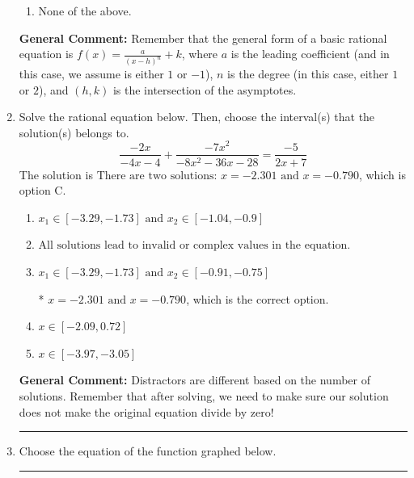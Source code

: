 \documentclass{extbook}[14pt]
\newcommand{\litem}[1]{\item #1

\rule{\textwidth}{0.4pt}}
\begin{document}
\begin{enumerate}
{\begin{enumerate}[label=\Alph*.]
\item None of the above.\end{enumerate}
\textbf{General Comment:} Remember that the general form of a basic rational equation is $ f(x) = \frac{a}{(x-h)^n} + k$, where $a$ is the leading coefficient (and in this case, we assume is either $1$ or $-1$), $n$ is the degree (in this case, either $1$ or $2$), and $(h, k)$ is the intersection of the asymptotes.
}
\litem{
Solve the rational equation below. Then, choose the interval(s) that the solution(s) belongs to.
\[ \frac{-2x}{-4x -4} + \frac{-7x^{2}}{-8x^{2} -36 x -28} = \frac{-5}{2x + 7} \]
The solution is \( \text{There are two solutions: } x = -2.301 \text{ and } x = -0.790 \), which is option C.\begin{enumerate}[label=\Alph*.]
\item \( x_1 \in [-3.29, -1.73] \text{ and } x_2 \in [-1.04,-0.9] \)


\item \( \text{All solutions lead to invalid or complex values in the equation.} \)


\item \( x_1 \in [-3.29, -1.73] \text{ and } x_2 \in [-0.91,-0.75] \)

* $x = -2.301 \text{ and } x = -0.790$, which is the correct option.
\item \( x \in [-2.09,0.72] \)


\item \( x \in [-3.97,-3.05] \)


\end{enumerate}

\textbf{General Comment:} Distractors are different based on the number of solutions. Remember that after solving, we need to make sure our solution does not make the original equation divide by zero!
}
\litem{
Choose the equation of the function graphed below.

}
\end{enumerate}
\end{document}
